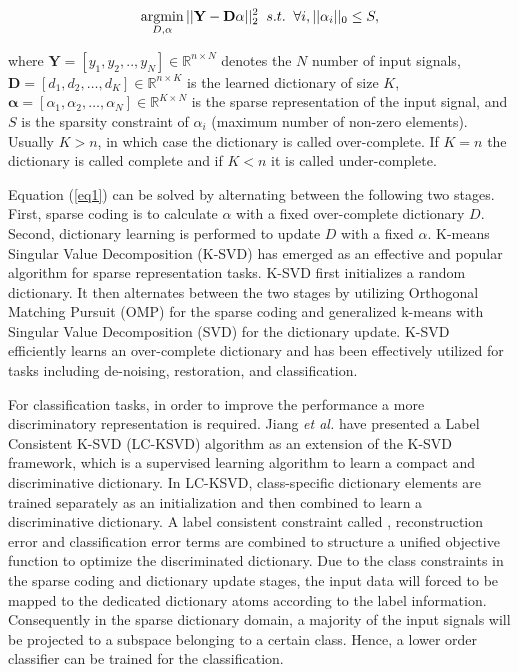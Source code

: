 \begin{equation}
    \label{eq1}
    \operatorname*{argmin}_{D,\alpha}||\mathbf{Y}-\mathbf{D} \mathbf{ \alpha }||_2^2  \;\; s.t.\;\; \forall i, || \alpha_i||_0 \leq S,
\end{equation}

\noindent where $\mathbf{Y}=[y_1,y_2,.., y_N] \in \mathbb{R}^{n\times N}$ denotes the $N$ number of input signals, $ \mathbf{D} = [d_1,d_2,\ldots,d_K] \in \mathbb{R}^{n \times K}$ is the learned dictionary of size $K$, $\mathbf{ \alpha } = [\alpha_1,\alpha_2,\ldots,\alpha_N ] \in \mathbb{R}^{K \times N}$ is the sparse representation of the input signal, and $S$ is the sparsity constraint of $\alpha_i$ (maximum number of non-zero elements). Usually  $K > n$, in which case the dictionary is called over-complete. If $K = n$ the dictionary is called complete and if $K < n$ it is called under-complete.

Equation (\ref{eq1}) can be solved by alternating between the following two stages. First, sparse coding is to calculate $\alpha$ with a fixed over-complete dictionary $D$. Second, dictionary learning is performed to update $D$ with a fixed $\alpha$. K-means Singular Value Decomposition (K-SVD)\cite{Aharon2006, Rubinstein2013} has emerged as an effective and popular algorithm for sparse representation tasks. K-SVD first initializes a random dictionary. It then alternates between the two stages by utilizing Orthogonal Matching Pursuit (OMP)\cite{Pati1993, Davis1997} for the sparse coding and generalized k-means with Singular Value Decomposition (SVD) for the dictionary update. K-SVD efficiently learns an over-complete dictionary and has been effectively utilized for tasks including de-noising, restoration, and classification.

For classification tasks, in order to improve the performance a more discriminatory representation is required. Jiang \textit{et al.}\cite{Jiang2011, Jiang2013} have presented a Label Consistent K-SVD (LC-KSVD) algorithm as an extension of the K-SVD framework, which is a supervised learning algorithm to learn a compact and discriminative dictionary. In LC-KSVD, class-specific dictionary elements are trained separately as an initialization and then combined to learn a discriminative dictionary. A label consistent constraint called , reconstruction error and classification error terms are combined to structure a unified objective function to optimize the discriminated dictionary. Due to the class constraints in the sparse coding and dictionary update stages, the input data will forced to be mapped to the dedicated dictionary atoms according to the label information. Consequently in the sparse dictionary domain, a majority of the input signals will be projected to a subspace belonging to a certain class. Hence, a lower order classifier can be trained for the classification. 

